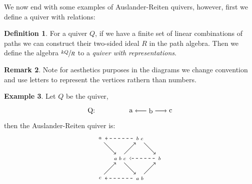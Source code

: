 \documentclass[11.5pt, twoside, a4paper, titlepage]{report}
\theoremstyle{definition}
\newtheorem{mydef}{Definition}[section]
\newtheorem{rem}[mydef]{Remark}
\newtheorem{eg}[mydef]{Example}
\theoremstyle{plain}
\begin{document}
We now end with some examples of Auslander-Reiten quivers, however, first we define a quiver with relations:

\begin{mydef}
For a quiver $Q$, if we have a finite set of linear combinations of paths we can construct their two-sided ideal $R$ in the path algebra. Then we define the algebra $\sfrac{kQ}{R}$ to a \emph{quiver with representations}.
\end{mydef}

\begin{rem}
Note for aesthetics purposes in the diagrams we change convention and use letters to represent the vertices rathern than numbers. 
\end{rem}

\begin{eg}
Let $Q$ be the quiver, 
\begin{equation*}
\begin{tikzpicture}[->,-latex, auto, every path/.style={->, semithick}, main node/.style={}]
\node 				(0) at (-2,0)		{Q:};
\node				(1) at (0,0)		{a};
\node 				(2) at (1,0)		{b};
\node 				(3) at (2,0)		{c};

\draw (2) edge (1);
\draw (2) edge (3);
\end{tikzpicture}
\end{equation*}
then the Auslander-Reiten quiver is:
\begin{equation*}
\begin{tikzpicture}[->,-latex, auto, main path/.style={->, semithick}, t path/.style={->, dashed, semithick}, every node/.style={}]
\node			(a) at (0,1)		{$\begin{smallmatrix}a\end{smallmatrix}$};
\node 			(c) at (0,-1)		{$\begin{smallmatrix}c\end{smallmatrix}$};
\node 			(abc) at (1,0)	{$\begin{smallmatrix}a & b & c \end{smallmatrix}$};
\node			(bc) at (2,1)		{$\begin{smallmatrix}b & c\end{smallmatrix}$};
\node 			(ab) at (2,-1)		{$\begin{smallmatrix}a & b\end{smallmatrix}$};
\node 			(b) at (3,0)		{$\begin{smallmatrix}b\end{smallmatrix}$};

\draw (a) [main path] edge (abc);
\draw (c) [main path] edge (abc);
\draw (abc) [main path] edge (bc);
\draw (abc) [main path] edge (ab);
\draw (bc) [main path] edge (b);
\draw (ab) [main path] edge (b);

\draw (bc) [t path] edge (a);
\draw (ab) [t path] edge (c);
\draw (b) [t path] edge (abc);
\end{tikzpicture}
\end{equation*}
\end{eg}
\end{document}
